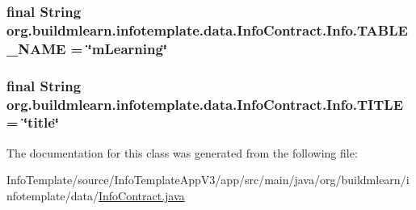 \subsubsection[{\texorpdfstring{T\+A\+B\+L\+E\+\_\+\+N\+A\+ME}{TABLE_NAME}}]{\setlength{\rightskip}{0pt plus 5cm}final String org.\+buildmlearn.\+infotemplate.\+data.\+Info\+Contract.\+Info.\+T\+A\+B\+L\+E\+\_\+\+N\+A\+ME = \char`\"{}m\+Learning\char`\"{}\hspace{0.3cm}{\ttfamily [static]}}\hypertarget{classorg_1_1buildmlearn_1_1infotemplate_1_1data_1_1InfoContract_1_1Info_a57dcca124ebee57d10fc9afc4d3081cb}{}\label{classorg_1_1buildmlearn_1_1infotemplate_1_1data_1_1InfoContract_1_1Info_a57dcca124ebee57d10fc9afc4d3081cb}
\subsubsection[{\texorpdfstring{T\+I\+T\+LE}{TITLE}}]{\setlength{\rightskip}{0pt plus 5cm}final String org.\+buildmlearn.\+infotemplate.\+data.\+Info\+Contract.\+Info.\+T\+I\+T\+LE = \char`\"{}title\char`\"{}\hspace{0.3cm}{\ttfamily [static]}}\hypertarget{classorg_1_1buildmlearn_1_1infotemplate_1_1data_1_1InfoContract_1_1Info_a41e655ab9ba4acc17c1b3a3484b338fa}{}\label{classorg_1_1buildmlearn_1_1infotemplate_1_1data_1_1InfoContract_1_1Info_a41e655ab9ba4acc17c1b3a3484b338fa}


The documentation for this class was generated from the following file\+:\begin{DoxyCompactItemize}
\item 
Info\+Template/source/\+Info\+Template\+App\+V3/app/src/main/java/org/buildmlearn/infotemplate/data/\hyperlink{InfoContract_8java}{Info\+Contract.\+java}\end{DoxyCompactItemize}
